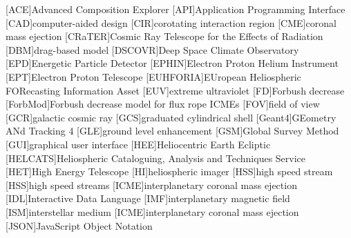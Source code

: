 	\begin{acronym}\itemsep0pt
	[ACE]{Advanced Composition Explorer}
	[API]{Application Programming Interface}
	[CAD]{computer-aided design}
	[CIR]{corotating interaction region}
	[CME]{coronal mass ejection}
	[CRaTER]{Cosmic Ray Telescope for the Effects of Radiation}
	[DBM]{drag-based model}
	[DSCOVR]{Deep Space Climate Observatory}
	[EPD]{Energetic Particle Detector}
	[EPHIN]{Electron Proton Helium Instrument}
	[EPT]{Electron Proton Telescope}
    [EUHFORIA]{EUropean Heliospheric FORecasting Information Asset}
	[EUV]{extreme ultraviolet}
	[FD]{Forbush decrease}
	[ForbMod]{Forbush decrease model for flux rope ICMEs}
	[FOV]{field of view}
	[GCR]{galactic cosmic ray}
	[GCS]{graduated cylindrical shell}
	[Geant4]{GEometry ANd Tracking 4}
	[GLE]{ground level enhancement}
	[GSM]{Global Survey Method}
	[GUI]{graphical user interface}
	[HEE]{Heliocentric Earth Ecliptic}
	[HELCATS]{Heliospheric Cataloguing, Analysis and Techniques Service}
	[HET]{High Energy Telescope}
	[HI]{heliospheric imager}
    [HSS]{high speed stream}
    [HSS]{high speed streams}
	[ICME]{interplanetary coronal mass ejection}
	[IDL]{Interactive Data Language}
	[IMF]{interplanetary magnetic field}
    [ISM]{interstellar medium}
	[ICME]{interplanetary coronal mass ejection}
	[JSON]{JavaScript Object Notation}

\end{acronym}
